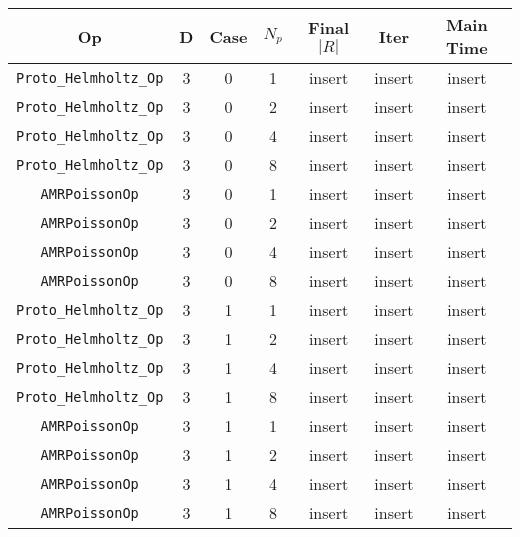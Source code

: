 \documentclass{article}
\begin{document}
\begin{small}
\begin{table}
\begin{center}
\begin{tabular}{|c|c|c|c|c|c||c|} \hline
 Op & D & Case & $N_p$ & Final $|R|$  &  Iter & Main Time \\
\hline
 {\tt Proto\_Helmholtz\_Op} & 3 & 0 &   1    &  insert  &  insert    & insert   \\
 {\tt Proto\_Helmholtz\_Op} & 3 & 0 &   2    &  insert  &  insert    & insert   \\
 {\tt Proto\_Helmholtz\_Op} & 3 & 0 &   4    &  insert  &  insert    & insert   \\
 {\tt Proto\_Helmholtz\_Op} & 3 & 0 &   8    &  insert  &  insert    & insert   \\
\hline                                                                               
 {\tt AMRPoissonOp}         & 3 & 0   & 1    &  insert  &  insert    & insert    \\
 {\tt AMRPoissonOp}         & 3 & 0   & 2    &  insert  &  insert    & insert    \\
 {\tt AMRPoissonOp}         & 3 & 0   & 4    &  insert  &  insert    & insert    \\
 {\tt AMRPoissonOp}         & 3 & 0   & 8    &  insert  &  insert    & insert    \\
\hline                                                                                     
 {\tt Proto\_Helmholtz\_Op} & 3 & 1   & 1    &  insert  &  insert    & insert   \\
 {\tt Proto\_Helmholtz\_Op} & 3 & 1   & 2    &  insert  &  insert    & insert   \\
 {\tt Proto\_Helmholtz\_Op} & 3 & 1   & 4    &  insert  &  insert    & insert   \\
 {\tt Proto\_Helmholtz\_Op} & 3 & 1   & 8    &  insert  &  insert    & insert   \\
\hline                                                                               
 {\tt AMRPoissonOp}         & 3 & 1   & 1    &  insert  &  insert    & insert    \\
 {\tt AMRPoissonOp}         & 3 & 1   & 2    &  insert  &  insert    & insert    \\
 {\tt AMRPoissonOp}         & 3 & 1   & 4    &  insert  &  insert    & insert    \\
 {\tt AMRPoissonOp}         & 3 & 1   & 8    &  insert  &  insert    & insert    \\
\hline                                                                               
                                                                                     

\end{tabular}
\end{center}
\end{table}
\end{small}
\end{document}
